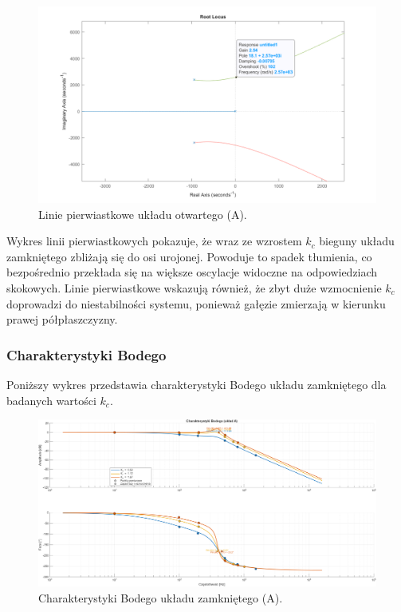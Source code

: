 \documentclass[12pt,a4paper]{article}
\begin{document}
	\begin{figure}[H]
		\centering
		\includegraphics[width=0.8\linewidth]{zdjecia/LP_ukladA.png}
		\caption{Linie pierwiastkowe układu otwartego (A).}
		\label{fig:LP_ukladA}
	\end{figure}
	
	Wykres linii pierwiastkowych pokazuje, że wraz ze wzrostem $k_c$ bieguny układu zamkniętego zbliżają się do osi urojonej. Powoduje to spadek tłumienia, co bezpośrednio przekłada się na większe oscylacje widoczne na odpowiedziach skokowych. Linie pierwiastkowe wskazują również, że zbyt duże wzmocnienie $k_c$ doprowadzi do niestabilności systemu, ponieważ gałęzie zmierzają w kierunku prawej półpłaszczyzny. 
	
	\subsubsection{Charakterystyki Bodego}
	Poniższy wykres przedstawia charakterystyki Bodego układu zamkniętego dla badanych wartości \(k_c\).
	
	\begin{figure}[H]
		\centering
		\includegraphics[width=1\linewidth]{zdjecia/Bode_ukladA.png}
		\caption{Charakterystyki Bodego układu zamkniętego (A).}
		\label{fig:Bode_ukladA}
	\end{figure}
	
\end{document}
